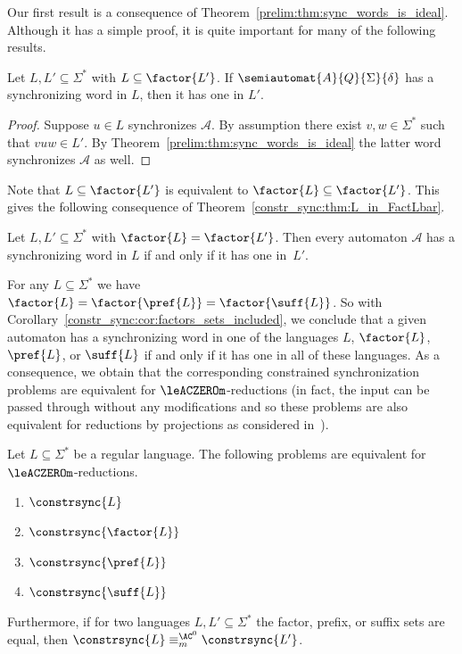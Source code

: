 
Our first result is a consequence of Theorem~\ref{prelim:thm:sync_words_is_ideal}. Although it has a simple proof,
it is quite important for many of the following results.

\begin{theorem}
	\label{constr_sync:thm:L_in_FactLbar}
	Let $L, L' \subseteq \Sigma^*$ with $L \subseteq \factor{L'}$.
	If $\semiautomat{A}{Q}{\Sigma}{\delta}$ 
	has a synchronizing word in $L$, then it has one in $L'$.
\end{theorem}
\begin{proof}
	Suppose $u \in L$ synchronizes $\mathcal A$.
	By assumption there exist $v, w \in \Sigma^*$
	such that $vuw \in L'$.
	By Theorem~\ref{prelim:thm:sync_words_is_ideal} the
	latter word synchronizes $\mathcal A$ as well.
\end{proof}

Note that $L \subseteq \factor{L'}$ is equivalent to $\factor{L} \subseteq \factor{L'}$.
This gives the following consequence of Theorem~\ref{constr_sync:thm:L_in_FactLbar}.

\begin{corollary}
	\label{constr_sync:cor:factors_sets_included}
	Let $L, L' \subseteq \Sigma^*$ with $\factor{L} = \factor{L'}$.
	Then every automaton $\mathcal A$ has a synchronizing word in $L$
	if and only if it has one in~$L'$.
\end{corollary}

For any $L \subseteq \Sigma^*$ we have
$\factor{L} = \factor{\pref{L}} = \factor{\suff{L}}$. So with Corollary~\ref{constr_sync:cor:factors_sets_included},
we conclude that a given automaton has a synchronizing word in one of
the languages $L$, $\factor{L}$, $\pref{L}$, or $\suff{L}$ if and only if it has one in all of these languages.
As a consequence, we obtain that the corresponding constrained synchronization problems
are equivalent for $\leACZEROm$-reductions (in fact,
the input can be passed through without any modifications
and so these problems are also equivalent
for reductions by projections as considered in~\cite{valiant1982rfducibility}).

\begin{corollary}
	\label{gen_results:cor:factors_etc_complexity}
	Let $L \subseteq \Sigma^*$ be a regular language. 
	The following problems are equivalent for~$\leACZEROm$-reductions.
	\begin{enumerate}
		\item $\constrsync{L}$
		\item $\constrsync{\factor{L}}$
		\item $\constrsync{\pref{L}}$
		\item $\constrsync{\suff{L}}$
	\end{enumerate}
	Furthermore, if for two languages $L, L'\subseteq \Sigma^*$ the factor, prefix, or suffix sets %
	are equal, then $\constrsync{L} \equiv_m^{\AC^0} \constrsync{L'}$.
\end{corollary}

